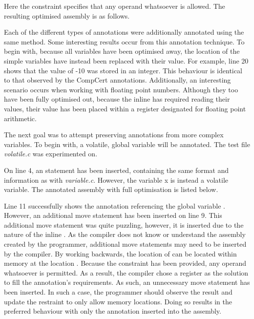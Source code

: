 Here the constraint  specifies that any operand whatsoever is allowed. The resulting optimised assembly is as follows.



Each of the different types of annotations were additionally annotated using the same method. Some interesting results occur from this annotation technique. To begin with, because all variables have been optimised away, the location of the simple variables have instead been replaced with their value. For example, line 20 shows that the value of -10 was stored in an integer. This behaviour is identical to that observed by the CompCert annotations. Additionally, an interesting scenario occurs when working with floating point numbers. Although they too have been fully optimised out, because the inline  has required reading their values, their value has been placed within a register designated for floating point arithmetic. 

The next goal was to attempt preserving annotations from more complex variables. To begin with, a volatile, global variable will be annotated. The test file \textit{volatile.c} was experimented on.



On line 4, an  statement has been inserted, containing the same format and information as with \textit{variable.c}. However, the variable x is instead a volatile variable. The annotated assembly with full optimisation is listed below.



Line 11 successfully shows the annotation referencing the global variable . However, an additional move statement has been inserted on line 9. This additional move statement was quite puzzling, however, it is inserted due to the nature of the inline . As the compiler does not know or understand the assembly created by the programmer, additional move statements may need to be inserted by the compiler. By working backwards, the location of  can be located within memory at the location . Because the constraint  has been provided, any operand whatsoever is permitted. As a result, the compiler chose a register as the solution to fill the annotation's requirements. As such, an unnecessary move statement has been inserted. In such a case, the programmer should observe the result and update the  restraint to only allow memory locations. Doing so results in the preferred behaviour with only the annotation inserted into the assembly. 

